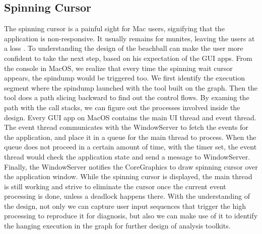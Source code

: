\subsection{Spinning Cursor} \label{subsec:spinningcursor}
The spinning cursor is a painful sight for Mac users, signifying that the application is non-responsive.
It usually remains for munites, leaving the users at a loss .                    
To understanding the design of the beachball can make the user more confident to take the next step, based on his expectation of the GUI apps.
From the console in MacOS, we realize that every time the spinning wait cursor appears, the spindump would be triggered too.
We first identify the execution segment where the spindump launched with the tool built on the graph.
Then the tool does a path slicing backward to find out the control flows.                       
By examing the path with the call stacks, we can figure out the processes involved inside the design.
Every GUI app on MacOS contains the main UI thread and event thread.                           
The event thread communicates with the WindowServer to fetch the events for the application, and place it in a queue for the main thread to process.
When the queue does not proceed in a certain amount of time, with the timer set, the event thread would check the application state and send a message to WindowServer. 
Finally, the WindowServer notifies the CoreGraphics to draw spinning cursor over the application window.                 
While the spinning cursor is displayed, the main thread is still working and strive to eliminate the cursor once the current event processing is done, unless a deadlock happens there.
With the understanding of the design, not only we can capture user input sequences that trigger the high processing to reproduce it for diagnosis, but also we can make use of it to identify the hanging execution in the graph for further design of analysis toolkits.

